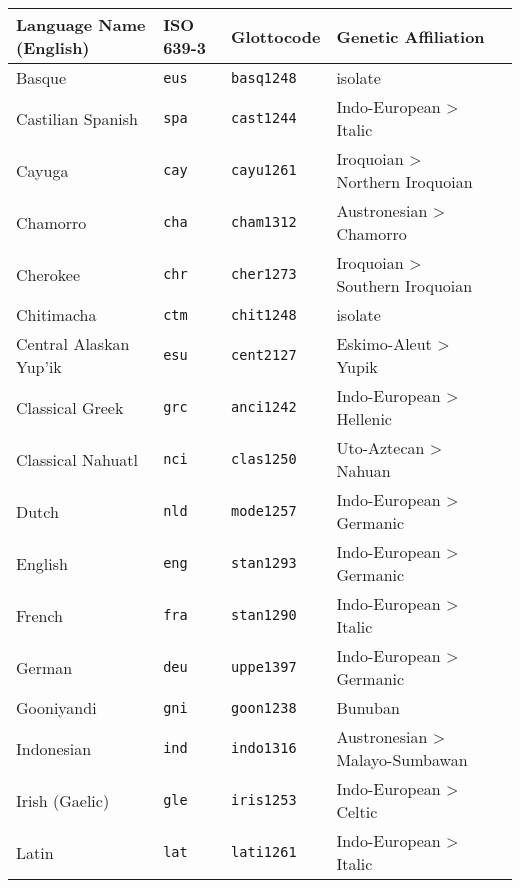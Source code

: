 \begin{longtable}[c]{ l l l l l }
  \onehalfspacing
  \textbf{Language Name (English)} & \textbf{ISO 639-3} & \textbf{Glottocode} & \textbf{Genetic Affiliation}\\
  \midrule
  Basque                           & \texttt{eus}       & \texttt{basq1248}   & isolate\\
  Castilian Spanish                & \texttt{spa}       & \texttt{cast1244}   & Indo-European > Italic\\
  Cayuga                           & \texttt{cay}       & \texttt{cayu1261}   & Iroquoian > Northern Iroquoian\\
  Chamorro                         & \texttt{cha}       & \texttt{cham1312}   & Austronesian > Chamorro\\
  Cherokee                         & \texttt{chr}       & \texttt{cher1273}   & Iroquoian > Southern Iroquoian\\
  Chitimacha                       & \texttt{ctm}       & \texttt{chit1248}   & isolate\\
  Central Alaskan Yup'ik           & \texttt{esu}       & \texttt{cent2127}   & Eskimo-Aleut > Yupik\\
  Classical Greek                  & \texttt{grc}       & \texttt{anci1242}   & Indo-European > Hellenic\\
  Classical Nahuatl                & \texttt{nci}       & \texttt{clas1250}   & Uto-Aztecan > Nahuan\\
  Dutch                            & \texttt{nld}       & \texttt{mode1257}   & Indo-European > Germanic\\
  English                          & \texttt{eng}       & \texttt{stan1293}   & Indo-European > Germanic\\
  French                           & \texttt{fra}       & \texttt{stan1290}   & Indo-European > Italic\\
  German                           & \texttt{deu}       & \texttt{uppe1397}   & Indo-European > Germanic\\
  Gooniyandi                       & \texttt{gni}       & \texttt{goon1238}   & Bunuban\\
  Indonesian                       & \texttt{ind}       & \texttt{indo1316}   & Austronesian > Malayo-Sumbawan\\
  Irish (Gaelic)                   & \texttt{gle}       & \texttt{iris1253}   & Indo-European > Celtic\\
  Latin                            & \texttt{lat}       & \texttt{lati1261}   & Indo-European > Italic\\

\end{longtable}
